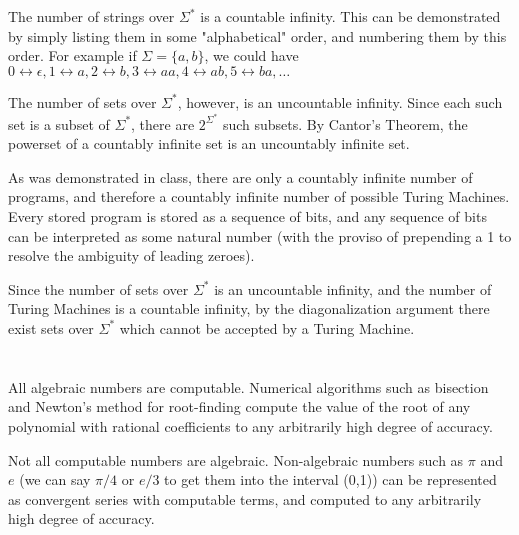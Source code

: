 \documentclass{article}
\begin{document}
\section{}
The number of strings over $\Sigma^*$ is a countable infinity. This can be
demonstrated by simply listing them in some "alphabetical" order, and numbering
them by this order. For example if $\Sigma = \{a,b\}$, we could have
$0 \leftrightarrow \epsilon, 1 \leftrightarrow a, 2 \leftrightarrow b,
3 \leftrightarrow aa, 4 \leftrightarrow ab, 5 \leftrightarrow ba, \ldots$

\vspace{1em}

The number of sets over $\Sigma^*$, however, is an uncountable infinity. Since
each such set is a subset of
$\Sigma^*$, there are $2^{\Sigma^*}$ such subsets. By Cantor's Theorem, the
powerset of a countably infinite set is an uncountably infinite set.

\vspace{1em}

As was demonstrated in class, there are only a countably infinite number of 
programs, and therefore a countably infinite number of possible Turing Machines.
Every stored program is stored as a sequence of bits, and any sequence of bits
can be interpreted as some natural number (with the proviso of prepending a 1
to resolve the ambiguity of leading zeroes).

\vspace{1em}

Since the number of sets over $\Sigma^*$ is an uncountable infinity, and the
number of Turing Machines is a countable infinity, by the diagonalization
argument there exist sets over $\Sigma^*$ which cannot be accepted by a Turing
Machine.

\section{}
All algebraic numbers are computable. Numerical algorithms such as bisection and
Newton's method for root-finding compute the value of the root of any
polynomial with rational coefficients to any arbitrarily high degree of
accuracy.

\vspace{1em}

Not all computable numbers are algebraic. Non-algebraic numbers such as $\pi$
and $e$ (we can say $\pi/4$ or $e/3$ to get them into the interval (0,1)) can be
represented as convergent series with computable terms, and computed
to any arbitrarily high degree of accuracy.
\end{document}
